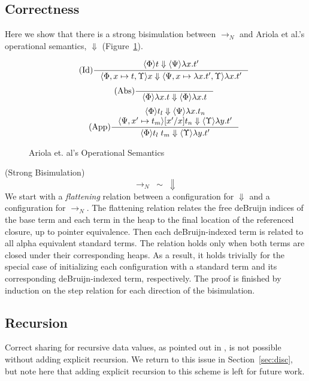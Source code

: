 \subsection{Correctness}

Here we show that there is a strong bisimulation between $\rightarrow_{N}$ and
Ariola et al.'s operational semantics, $\Downarrow$ (Figure~\ref{fig:cbn}). 

\begin{figure}
\begin{align*}
\tag{Id} \inference
{\langle \Phi \rangle t \Downarrow \langle \Psi \rangle \lambda x.t'}
{\langle \Phi, x \mapsto t, \Upsilon \rangle x \Downarrow \langle \Psi, x
\mapsto \lambda x.t', \Upsilon \rangle \lambda x.t'}
\end{align*}
\begin{align*}
\tag{Abs} \inference 
{}
{\langle \Phi \rangle \lambda x . t \Downarrow \langle \Phi \rangle \lambda x.t}
\end{align*}
\begin{align*}
\tag{App} \inference
{\langle \Phi \rangle t_l \Downarrow \langle \Psi \rangle \lambda 
x.t_n \\ \langle \Psi, x' \mapsto t_m \rangle [x'/x]t_n \Downarrow \langle
\Upsilon \rangle \lambda y.t'}
{\langle \Phi \rangle t_l \; t_m \Downarrow \langle \Upsilon \rangle \lambda y.t'}
\end{align*}
\caption{Ariola et. al's Operational Semantics}
\label{fig:cbn}
\end{figure}

{\theorem \textnormal{(Strong Bisimulation)} $$\xrightarrow{}_{N} \; \sim \;
\Downarrow$$}
We start with a \emph{flattening} relation between a configuration for
$\Downarrow$ and a configuration for $\xrightarrow{}_{N}$. The flattening
relation relates the free deBruijn indices of the base term and each term in
the heap to the final location of the referenced closure, up to pointer
equivalence. Then each deBruijn-indexed term is related to all alpha equivalent
standard terms. The relation holds only when both terms are closed under their
corresponding heaps. As a result, it holds trivially for the special case of
initializing each configuration with a standard term and its corresponding
deBruijn-indexed term, respectively. The proof is finished by induction on the
step relation for each direction of the bisimulation.

\subsection{Recursion}

Correct sharing for recursive data values, as pointed out in
\cite{ariola1995call}, is not possible without adding explicit recursion. We
return to this issue in Section~\ref{sec:disc}, but note here that adding
explicit recursion to this scheme is left for future work.
